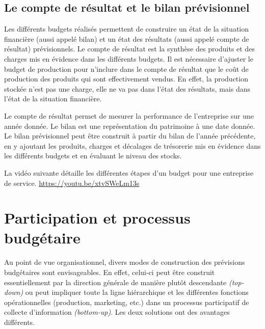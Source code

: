 \documentclass[oneside]{kaobook}
\begin{document}
\subsection{Le compte de résultat et le bilan prévisionnel}
\label{sec:orgb83ba94}
Les différents budgets réalisés permettent de construire un état de la situation financière (aussi appelé bilan) et un état des résultats (aussi appelé compte de résultat) prévisionnels. Le compte de résultat est la synthèse des produits et des charges mis en évidence dans les différents budgets. Il est nécessaire d'ajuster le budget de production pour n'inclure dans le compte de résultat que le coût de production des produits qui sont effectivement vendus. En effet, la production stockée n'est pas une charge, elle ne va pas dans l'état des résultats, mais dans l'état de la situation financière.

Le compte de résultat permet de mesurer la performance de l'entreprise sur une année donnée. Le bilan est une représentation du patrimoine à une date donnée. Le bilan prévisionnel peut être construit à partir du bilan de l'année précédente, en y ajoutant les produits, charges et décalages de trésorerie mis en évidence dans les différents budgets et en évaluant le niveau des stocks. 

\begin{kaobox}
La vidéo suivante détaille les différentes étapes d'un budget pour une entreprise de service.
\url{https://youtu.be/xtvSWeLm13s}
\end{kaobox}

\section{Participation et processus budgétaire}
\label{sec:orgc16e13e}
Au point de vue organisationnel, divers modes de construction des prévisions budgétaires sont envisageables. En effet, celui-ci peut être construit essentiellement par la direction générale de manière plutôt descendante \emph{(top-down)} ou peut impliquer toute la ligne hiérarchique et les différentes fonctions opérationnelles (production, marketing, etc.) dans un processus participatif de collecte d'information \emph{(bottom-up)}. Les deux solutions ont des avantages différents.
\end{document}
